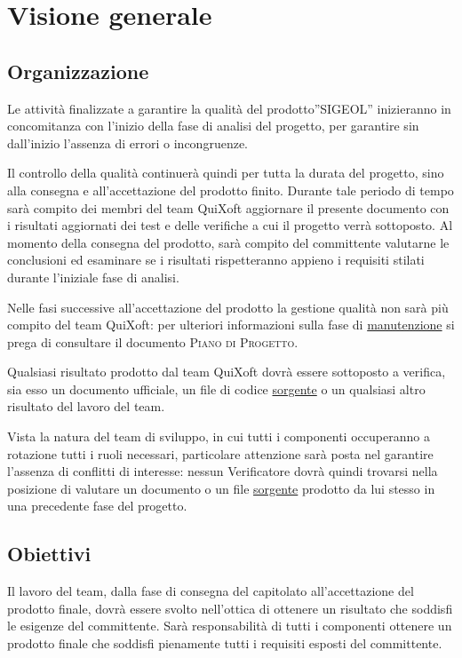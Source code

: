 \documentclass[11pt,a4paper]{article}
\begin{document}
\section{Visione generale}
\subsection{Organizzazione} 
Le attività finalizzate a garantire la qualità del prodotto''SIGEOL'' inizieranno in concomitanza con l'inizio della fase di analisi del progetto, per garantire sin dall'inizio l'assenza di errori o incongruenze.

Il controllo della qualità continuerà quindi per tutta la durata del progetto, sino alla consegna e all'accettazione del prodotto finito. Durante tale periodo di tempo sarà compito dei membri del team QuiXoft aggiornare il presente documento con i risultati aggiornati dei test e delle verifiche a cui il progetto verrà sottoposto. Al momento della consegna del prodotto, sarà compito del committente valutarne le conclusioni ed esaminare se i risultati rispetteranno appieno i requisiti stilati durante l'iniziale fase di analisi.

Nelle fasi successive all'accettazione del prodotto la gestione qualità non sarà più compito del team QuiXoft: per ulteriori informazioni sulla fase di \underline{manutenzione} si prega di consultare il documento \textsc{Piano di Progetto}.

Qualsiasi risultato prodotto dal team QuiXoft dovrà essere sottoposto a verifica, sia esso un documento ufficiale, un file di codice \underline{sorgente} o un qualsiasi altro risultato del lavoro del team.

Vista la natura del team di sviluppo, in cui tutti i componenti occuperanno a rotazione tutti i ruoli necessari, particolare attenzione sarà posta nel garantire l'assenza di conflitti di interesse: nessun Verificatore dovrà quindi trovarsi nella posizione di valutare un documento o un file \underline{sorgente} prodotto da lui stesso in una precedente fase del progetto.

\subsection{Obiettivi}
Il lavoro del team, dalla fase di consegna del capitolato all'accettazione del prodotto finale, dovrà essere svolto nell'ottica di ottenere un risultato che soddisfi le esigenze del committente. Sarà responsabilità di tutti i componenti ottenere un prodotto finale che soddisfi pienamente tutti i requisiti esposti del committente.
\end{document}
